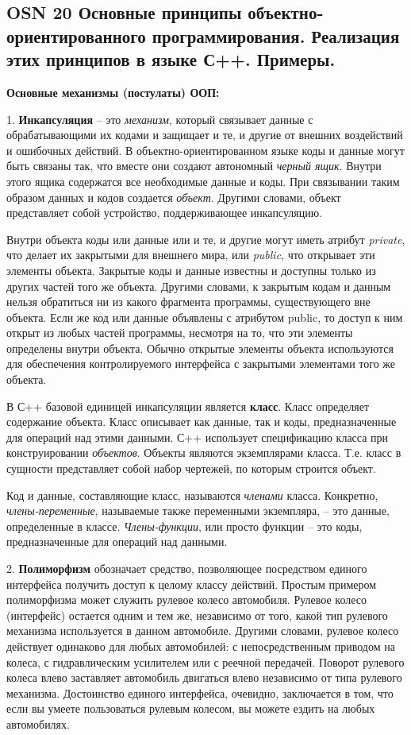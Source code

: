 \subsection{OSN 20 Основные принципы объектно-ориентированного программирования. Реализация этих принципов в языке С++. Примеры.}


\centerline{\textbf{Основные механизмы (постулаты) ООП:}}

1. \textbf{Инкапсуляция} -- это \textit{механизм}, который связывает данные с обрабатывающими их кодами и защищает и те, и другие от внешних воздействий и ошибочных действий. В объектно-ориентированном языке коды и данные могут быть связаны так, что вместе они создают автономный \textit{черный ящик}. Внутри этого ящика содержатся все необходимые данные и коды. При связывании таким образом данных и кодов создается \textit{объект}. Другими словами, объект представляет собой устройство, поддерживающее инкапсуляцию.
    
Внутри объекта коды или данные или и те, и другие могут иметь атрибут \textit{private}, что делает их закрытыми для внешнего мира, или \textit{public}, что открывает эти элементы объекта. Закрытые коды и данные известны и доступны только из других частей того же объекта. Другими словами, к закрытым кодам и данным нельзя обратиться ни из какого фрагмента программы, существующего вне объекта. Если же код или данные объявлены с атрибутом public, то доступ к ним открыт из любых частей программы, несмотря на то, что эти элементы определены внутри объекта. Обычно открытые элементы объекта используются для обеспечения контролируемого интерфейса с закрытыми элементами того же объекта.
    
В С++ базовой единицей инкапсуляции является \textbf{класс}. Класс определяет содержание объекта. Класс описывает как данные, так и коды, предназначенные для операций над этими данными. С++ использует спецификацию класса при конструировании \textit{объектов}. Объекты являются экземплярами класса. Т.е. класс в сущности представляет собой набор чертежей, по которым строится объект.
    
Код и данные, составляющие класс, называются \textit{членами} класса. Конкретно, \textit{члены-переменные}, называемые также переменными экземпляра, -- это данные, определенные в классе. \textit{Члены-функции}, или просто функции -- это коды, предназначенные для операций над данными.
    
2. \textbf{Полиморфизм} обозначает средство, позволяющее посредством единого интерфейса получить доступ к целому классу действий. Простым примером полиморфизма может служить рулевое колесо автомобиля. Рулевое колесо (интерфейс) остается одним и тем же, независимо от того, какой тип рулевого механизма используется в данном автомобиле. Другими словами, рулевое колесо действует одинаково для любых автомобилей: с непосредственным приводом на колеса, с гидравлическим усилителем или с реечной передачей. Поворот рулевого колеса влево заставляет автомобиль двигаться влево независимо от типа рулевого механизма. Достоинство единого интерфейса, очевидно, заключается в том, что если вы умеете пользоваться рулевым колесом, вы можете ездить на любых автомобилях.
    
